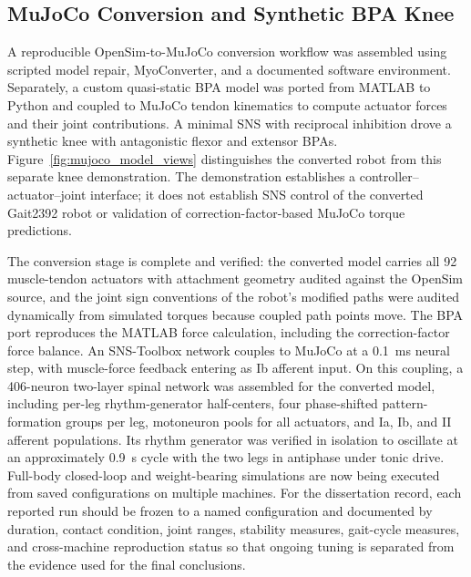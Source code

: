 \subsection{MuJoCo Conversion and Synthetic BPA Knee}

A reproducible OpenSim-to-MuJoCo conversion workflow was assembled using scripted model repair, MyoConverter, and a documented software environment. Separately, a custom quasi-static BPA model was ported from MATLAB to Python and coupled to MuJoCo tendon kinematics to compute actuator forces and their joint contributions. A minimal SNS with reciprocal inhibition drove a synthetic knee with antagonistic flexor and extensor BPAs. Figure~\ref{fig:mujoco_model_views} distinguishes the converted robot from this separate knee demonstration. The demonstration establishes a controller--actuator--joint interface; it does not establish SNS control of the converted Gait2392 robot or validation of correction-factor-based MuJoCo torque predictions.

\begin{reviewchange}
The conversion stage is complete and verified: the converted model carries all 92 muscle-tendon actuators with attachment geometry audited against the OpenSim source, and the joint sign conventions of the robot's modified paths were audited dynamically from simulated torques because coupled path points move. The BPA port reproduces the MATLAB force calculation, including the correction-factor force balance. An SNS-Toolbox network couples to MuJoCo at a \qty{0.1}{\milli\second} neural step, with muscle-force feedback entering as Ib afferent input. On this coupling, a 406-neuron two-layer spinal network was assembled for the converted model, including per-leg rhythm-generator half-centers, four phase-shifted pattern-formation groups per leg, motoneuron pools for all actuators, and Ia, Ib, and II afferent populations. Its rhythm generator was verified in isolation to oscillate at an approximately \qty{0.9}{\second} cycle with the two legs in antiphase under tonic drive. Full-body closed-loop and weight-bearing simulations are now being executed from saved configurations on multiple machines. For the dissertation record, each reported run should be frozen to a named configuration and documented by duration, contact condition, joint ranges, stability measures, gait-cycle measures, and cross-machine reproduction status so that ongoing tuning is separated from the evidence used for the final conclusions.
\end{reviewchange}

